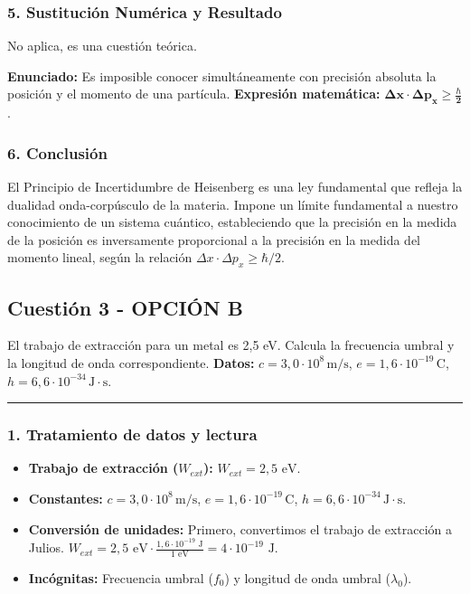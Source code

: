 \subsubsection*{5. Sustitución Numérica y Resultado}
No aplica, es una cuestión teórica.

\begin{cajaresultado}
    \textbf{Enunciado:} Es imposible conocer simultáneamente con precisión absoluta la posición y el momento de una partícula.
    \textbf{Expresión matemática:} $\boldsymbol{\Delta x \cdot \Delta p_x \ge \frac{\hbar}{2}}$.
\end{cajaresultado}

\subsubsection*{6. Conclusión}
\begin{cajaconclusion}
    El Principio de Incertidumbre de Heisenberg es una ley fundamental que refleja la dualidad onda-corpúsculo de la materia. Impone un límite fundamental a nuestro conocimiento de un sistema cuántico, estableciendo que la precisión en la medida de la posición es inversamente proporcional a la precisión en la medida del momento lineal, según la relación $\Delta x \cdot \Delta p_x \ge \hbar/2$.
\end{cajaconclusion}

\newpage

\subsection{Cuestión 3 - OPCIÓN B}
\label{subsec:5B_2005_sep_cv}

\begin{cajaenunciado}
El trabajo de extracción para un metal es 2,5 eV. Calcula la frecuencia umbral y la longitud de onda correspondiente.
\textbf{Datos:} $c=3,0\cdot10^8\,\text{m/s}$, $e=1,6\cdot10^{-19}\,\text{C}$, $h=6,6\cdot10^{-34}\,\text{J}\cdot\text{s}$.
\end{cajaenunciado}
\hrule

\subsubsection*{1. Tratamiento de datos y lectura}
\begin{itemize}
    \item \textbf{Trabajo de extracción ($W_{ext}$):} $W_{ext} = 2,5 \text{ eV}$.
    \item \textbf{Constantes:} $c=3,0\cdot10^8\,\text{m/s}$, $e=1,6\cdot10^{-19}\,\text{C}$, $h=6,6\cdot10^{-34}\,\text{J}\cdot\text{s}$.
    \item \textbf{Conversión de unidades:} Primero, convertimos el trabajo de extracción a Julios.
    $W_{ext} = 2,5 \text{ eV} \cdot \frac{1,6\cdot10^{-19} \text{ J}}{1 \text{ eV}} = 4 \cdot 10^{-19} \text{ J}$.
    \item \textbf{Incógnitas:} Frecuencia umbral ($f_0$) y longitud de onda umbral ($\lambda_0$).
\end{itemize}

